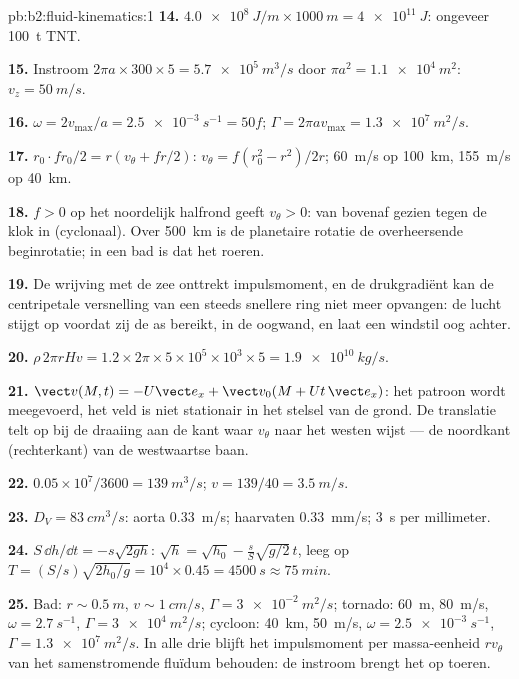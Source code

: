 \begin{solution}{pb:b2:fluid-kinematics:1}
\textbf{14.} $\qty{4.0e8}{J/m} \times \qty{1000}{m} = \qty{4e11}{J}$:
ongeveer \qty{100}{t} TNT.

\textbf{15.} Instroom $2\pi a \times 300 \times 5 = \qty{5.7e5}{m^3/s}$ door
$\pi a^2 = \qty{1.1e4}{m^2}$: $v_z = \qty{50}{m/s}$.

\textbf{16.} $\omega = 2v_{\max}/a = \qty{2.5e-3}{s^{-1}} = 50f$;
$\Gamma = 2\pi av_{\max}
= \qty{1.3e7}{m^2/s}$.

\textbf{17.} $r_0\cdot fr_0/2 = r(v_\theta + fr/2)$:
$v_\theta = f(r_0^2 - r^2)/2r$; \qty{60}{m/s} op \qty{100}{km},
\qty{155}{m/s} op \qty{40}{km}.

\textbf{18.} $f > 0$ op het noordelijk halfrond geeft $v_\theta > 0$: van
bovenaf gezien tegen de klok in (cyclonaal). Over \qty{500}{km} is de
planetaire rotatie de overheersende beginrotatie; in een bad is dat het
roeren.

\textbf{19.} De wrijving met de zee onttrekt impulsmoment, en de
drukgradiënt kan de centripetale versnelling van een steeds snellere ring
niet meer opvangen: de lucht stijgt op voordat zij de as bereikt, in de
oogwand, en laat een windstil oog achter.

\textbf{20.}
$\rho\,2\pi rHv = 1.2 \times 2\pi \times 5 \times 10^5 \times 10^3 \times 5 =
\qty{1.9e10}{kg/s}$.

\textbf{21.} $\vect v(M, t) = -U\vect e_x + \vect v_0(M + Ut\,\vect e_x)$:
het patroon wordt meegevoerd, het veld is niet stationair in het stelsel van
de grond. De translatie telt op bij de draaiing aan de kant waar $v_\theta$
naar het westen wijst --- de noordkant (rechterkant) van de westwaartse
baan.

\textbf{22.} $0.05 \times 10^7/3600 = \qty{139}{m^3/s}$;
$v = 139/40 = \qty{3.5}{m/s}$.

\textbf{23.} $D_V = \qty{83}{cm^3/s}$: aorta \qty{0.33}{m/s}; haarvaten
\qty{0.33}{mm/s}; \qty{3}{s} per millimeter.

\textbf{24.} $S\,\dd h/\dd t = -s\sqrt{2gh}$:
$\sqrt h = \sqrt{h_0} -
\frac sS\sqrt{g/2}\,t$, leeg op
$T = (S/s)\sqrt{2h_0/g} = 10^4 \times 0.45 =
\qty{4500}{s} \approx \qty{75}{min}$.

\textbf{25.} Bad: $r \sim \qty{0.5}{m}$, $v \sim \qty{1}{cm/s}$,
$\Gamma =
\qty{3e-2}{m^2/s}$; tornado: \qty{60}{m}, \qty{80}{m/s},
$\omega = \qty{2.7}{s^{-1}}$, $\Gamma = \qty{3e4}{m^2/s}$; cycloon:
\qty{40}{km}, \qty{50}{m/s}, $\omega =
\qty{2.5e-3}{s^{-1}}$,
$\Gamma = \qty{1.3e7}{m^2/s}$. In alle drie blijft het impulsmoment per
massa-eenheid $rv_\theta$ van het samenstromende fluïdum behouden: de
instroom brengt het op toeren.
\end{solution}
